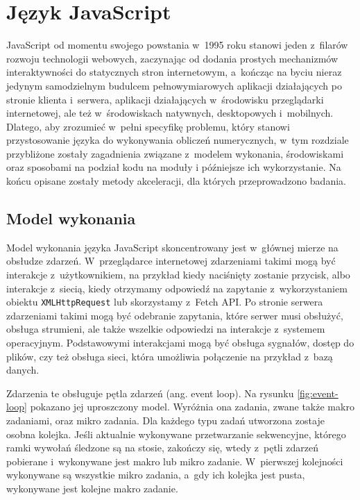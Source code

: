 \chapter{Język JavaScript}

JavaScript od momentu swojego powstania w~1995 roku stanowi jeden z~filarów rozwoju technologii webowych, zaczynając od dodania prostych mechanizmów interaktywności do statycznych stron internetowym, a~kończąc na byciu nieraz jedynym samodzielnym budulcem pełnowymiarowych aplikacji działających po stronie klienta i~serwera, aplikacji działających w~środowisku przeglądarki internetowej, ale też w~środowiskach natywnych, desktopowych i~mobilnych. Dlatego, aby zrozumieć w~pełni specyfikę problemu, który stanowi przystosowanie języka do wykonywania obliczeń numerycznych, w~tym rozdziale przybliżone zostały zagadnienia związane z~modelem wykonania, środowiskami oraz sposobami na podział kodu na moduły i późniejsze ich wykorzystanie. Na końcu opisane zostały metody akceleracji, dla których przeprowadzono badania.



\section{Model wykonania}

Model wykonania języka JavaScript skoncentrowany jest w~głównej mierze na obsłudze zdarzeń. W~przeglądarce internetowej zdarzeniami takimi mogą być interakcje z~użytkownikiem, na przykład kiedy naciśnięty zostanie przycisk, albo interakcje z~siecią, kiedy otrzymamy odpowiedź na zapytanie z~wykorzystaniem obiektu \lstinline{XMLHttpRequest} lub skorzystamy z~Fetch API. Po stronie serwera zdarzeniami takimi mogą być odebranie zapytania, które serwer musi obsłużyć, obsługa strumieni, ale także wszelkie odpowiedzi na interakcje z~systemem operacyjnym. Podstawowymi interakcjami mogą być obsługa sygnałów, dostęp do plików, czy też obsługa sieci, która umożliwia połączenie na przykład z~bazą danych.

Zdarzenia te obsługuje pętla zdarzeń (ang. event loop). Na rysunku \ref{fig:event-loop} pokazano jej uproszczony model. Wyróżnia ona zadania, zwane także makro zadaniami, oraz mikro zadania. Dla każdego typu zadań utworzona zostaje osobna kolejka. Jeśli aktualnie wykonywane przetwarzanie sekwencyjne, którego ramki wywołań śledzone są na stosie, zakończy się, wtedy z~pętli zdarzeń pobierane i~wykonywane jest makro lub mikro zadanie. W~pierwszej kolejności wykonywane są wszystkie mikro zadania, a~gdy ich kolejka jest pusta, wykonywane jest kolejne makro zadanie.

